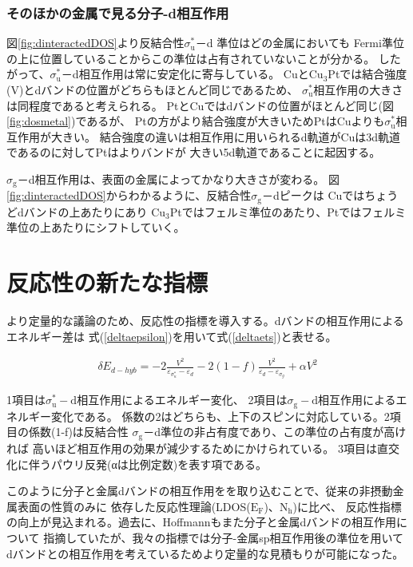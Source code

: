 \documentclass[12pt]{ltjsarticle}
\begin{document}
\subsubsection{そのほかの金属で見る分子-d相互作用}
図\ref{fig:dinteractedDOS}より反結合性$\sigma _\text{u} ^* $－d 準位はどの金属においても
Fermi準位の上に位置していることからこの準位は占有されていないことが分かる。
したがって、$ \sigma _\text{u} ^*$－d相互作用は常に安定化に寄与している。
Cuと$\text{Cu}_\text{3}$Ptでは結合強度(V)とdバンドの位置がどちらもほとんど同じであるため、
$ \sigma _\text{u}^*$相互作用の大きさは同程度であると考えられる。
PtとCuではdバンドの位置がほとんど同じ(図\ref{fig:dosmetal})であるが、
Ptの方がより結合強度が大きいためPtはCuよりも$ \sigma _\text{u}^*$相互作用が大きい。
結合強度の違いは相互作用に用いられるd軌道がCuは3d軌道であるのに対してPtはよりバンドが
大きい5d軌道であることに起因する。

$\sigma _\text{g}$－d相互作用は、表面の金属によってかなり大きさが変わる。
図\ref{fig:dinteractedDOS}からわかるように、反結合性$\sigma _\text{g}$－dピークは
Cuではちょうどdバンドの上あたりにあり
$\text{Cu}_\text{3}$Ptではフェルミ準位のあたり、Ptではフェルミ準位の上あたりにシフトしていく。

\section{反応性の新たな指標}
より定量的な議論のため、反応性の指標を導入する。dバンドの相互作用によるエネルギー差は
式(\ref{deltaepsilon})を用いて式(\ref{deltaets})と表せる。

\begin{eqnarray}
    \label{deltaets}
    \delta E_{d-hyb} = -2 \frac{ V^2 }{\varepsilon _{\sigma_u^*} - \varepsilon _d}
                    -2(1-f)\frac{V^2}{\varepsilon _d - \varepsilon _{\sigma_g}}
                    + \alpha V^2
\end{eqnarray}

1項目は$\sigma _\text{u}^* -\text{d}$相互作用によるエネルギー変化、
2項目は$\sigma _\text{g}-\text{d}$相互作用によるエネルギー変化である。
係数の2はどちらも、上下のスピンに対応している。2項目の係数(1-f)は反結合性
$\sigma_\text{g}$－d準位の非占有度であり、この準位の占有度が高ければ
高いほど相互作用の効果が減少するためにかけられている。
3項目は直交化に伴うパウリ反発(αは比例定数)を表す項である。

このように分子と金属dバンドの相互作用をを取り込むことで、従来の非摂動金属表面の性質のみに
依存した反応性理論(LDOS($\text{E}_\text{F}$)、$\text{N}_\text{h}$)に比べ、
反応性指標の向上が見込まれる。過去に、Hoffmannもまた分子と金属dバンドの相互作用について
指摘していた\cite{Hoffman1988}が、我々の指標では分子-金属sp相互作用後の準位を用いて
dバンドとの相互作用を考えているためより定量的な見積もりが可能になった。
\end{document}
